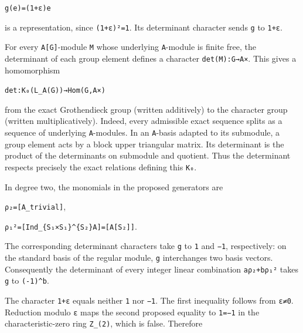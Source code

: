 \documentclass[
  10pt,
]{article}
\begin{document}
\texttt{\small g(\allowbreak{}e)\allowbreak{}=\allowbreak{}(\allowbreak{}1+\allowbreak{}ε)\allowbreak{}e}

is a representation, since
\texttt{\small (\allowbreak{}1+\allowbreak{}ε)\allowbreak{}²=\allowbreak{}1}.
Its determinant character sends \texttt{\small g} to
\texttt{\small 1+\allowbreak{}ε}.

For every \texttt{\small A[\allowbreak{}G]\allowbreak{}}-module
\texttt{\small M} whose underlying \texttt{\small A}-module is finite
free, the determinant of each group element defines a character
\texttt{\small det(\allowbreak{}M)\allowbreak{}:\allowbreak{}G→\allowbreak{}A×}.
This gives a homomorphism

\texttt{\small det:\allowbreak{}K₀(\allowbreak{}L\_\allowbreak{}A(\allowbreak{}G)\allowbreak{})\allowbreak{}→\allowbreak{}Hom(\allowbreak{}G,\allowbreak{}A×)\allowbreak{}}

from the exact Grothendieck group (written additively) to the character
group (written multiplicatively). Indeed, every admissible exact
sequence splits as a sequence of underlying \texttt{\small A}-modules.
In an \texttt{\small A}-basis adapted to its submodule, a group element
acts by a block upper triangular matrix. Its determinant is the product
of the determinants on submodule and quotient. Thus the determinant
respects precisely the exact relations defining this \texttt{\small K₀}.

In degree two, the monomials in the proposed generators are

\texttt{\small ρ₂=\allowbreak{}[\allowbreak{}A\_\allowbreak{}trivial]\allowbreak{}},

\texttt{\small ρ₁²=\allowbreak{}[\allowbreak{}Ind\_\allowbreak{}\{S₁×S₁\}\textasciicircum{}\{S₂\}A]\allowbreak{}=\allowbreak{}[\allowbreak{}A[\allowbreak{}S₂]\allowbreak{}]\allowbreak{}}.

The corresponding determinant characters take \texttt{\small g} to
\texttt{\small 1} and \texttt{\small −1}, respectively: on the standard
basis of the regular module, \texttt{\small g} interchanges two basis
vectors. Consequently the determinant of every integer linear
combination \texttt{\small aρ₂+\allowbreak{}bρ₁²} takes
\texttt{\small g} to
\texttt{\small (\allowbreak{}-\allowbreak{}1)\allowbreak{}\textasciicircum{}b}.

The character \texttt{\small 1+\allowbreak{}ε} equals neither
\texttt{\small 1} nor \texttt{\small −1}. The first inequality follows
from \texttt{\small ε≠0}. Reduction modulo \texttt{\small ε} maps the
second proposed equality to \texttt{\small 1=\allowbreak{}−1} in the
characteristic-zero ring
\texttt{\small Z\_\allowbreak{}(\allowbreak{}2)\allowbreak{}}, which is
false. Therefore
\end{document}
